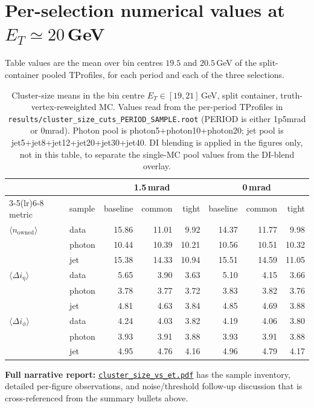 \documentclass[11pt,a4paper]{article}
\begin{document}
\appendix
\section{\texorpdfstring{Per-selection numerical values at $E_T\simeq 20$\,GeV}{Per-selection numerical values at ET ~ 20 GeV}}
\label{app:numbers}

Table values are the mean over bin centres $19.5$ and $20.5$\,GeV of
the split-container pooled TProfiles, for each period and each of the
three selections.

\begin{table}[H]
\centering\small
\begin{tabular}{llrrrrrr}
\toprule
 & & \multicolumn{3}{c}{1.5\,mrad} & \multicolumn{3}{c}{0\,mrad}\\
\cmidrule(lr){3-5}\cmidrule(lr){6-8}
metric & sample & baseline & common & tight & baseline & common & tight \\
\midrule
$\langle n_{\mathrm{owned}}\rangle$   & data   & 15.86 & 11.01 & 9.92 & 14.37 & 11.77 & 9.98 \\
                                      & photon & 10.44 & 10.39 & 10.21 & 10.56 & 10.51 & 10.32 \\
                                      & jet    & 15.38 & 14.33 & 10.94 & 15.51 & 14.59 & 11.05 \\
\midrule
$\langle \Delta i_\eta\rangle$         & data   &  5.65 &  3.90 & 3.63 &  5.10 &  4.15 & 3.66 \\
                                      & photon &  3.78 &  3.77 & 3.72 &  3.83 &  3.82 & 3.76 \\
                                      & jet    &  4.81 &  4.63 & 3.84 &  4.85 &  4.69 & 3.88 \\
\midrule
$\langle \Delta i_\phi\rangle$         & data   &  4.24 &  4.03 & 3.82 &  4.19 &  4.06 & 3.80 \\
                                      & photon &  3.93 &  3.91 & 3.88 &  3.93 &  3.91 & 3.88 \\
                                      & jet    &  4.95 &  4.76 & 4.16 &  4.96 &  4.79 & 4.17 \\
\bottomrule
\end{tabular}
\caption{Cluster-size means in the bin centre $E_T\in[19,21]$\,GeV,
split container, truth-vertex-reweighted MC.  Values read from
the per-period TProfiles in
\texttt{results/cluster\_size\_cuts\_PERIOD\_SAMPLE.root}
(PERIOD is either 1p5mrad or 0mrad).
Photon pool is photon5+photon10+photon20; jet pool is
jet5+jet8+jet12+jet20+jet30+jet40.  DI blending is applied in the
figures only, not in this table, to separate the single-MC pool
values from the DI-blend overlay.}
\label{tab:numbers}
\end{table}

\vspace{0.4em}
\noindent\textbf{Full narrative report:}
\href{https://shuonli.github.io/ppg12/}{\nolinkurl{cluster_size_vs_et.pdf}}
has the sample inventory, detailed per-figure observations, and
noise/threshold follow-up discussion that is cross-referenced from the
summary bullets above.
\end{document}
